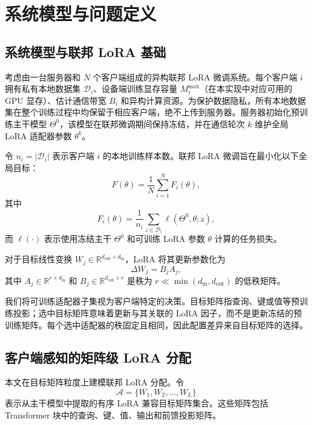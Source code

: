 \documentclass[10pt,conference,letterpaper]{IEEEtran}
\begin{document}
\section{系统模型与问题定义}\label{sec.model}

\subsection{系统模型与联邦 LoRA 基础}
考虑由一台服务器和 $N$ 个客户端组成的异构联邦 LoRA 微调系统。每个客户端 $i$ 拥有私有本地数据集 $\mathcal{D}_i$、设备端训练显存容量 $M_i^{\max}$（在本实现中对应可用的 GPU 显存）、估计通信带宽 $B_i$ 和异构计算资源。为保护数据隐私，所有本地数据集在整个训练过程中均保留于相应客户端，绝不上传到服务器。服务器初始化预训练主干模型 $\Theta^0$，该模型在联邦微调期间保持冻结，并在通信轮次 $k$ 维护全局 LoRA 适配器参数 $\theta^k$。

令 $n_i=|\mathcal{D}_i|$ 表示客户端 $i$ 的本地训练样本数。联邦 LoRA 微调旨在最小化以下全局目标：
\begin{equation}
F(\theta)=\frac{1}{N}\sum_{i=1}^{N}F_i(\theta),
\end{equation}
其中
\begin{equation}
F_i(\theta)=
\frac{1}{n_i}
\sum_{z\in\mathcal{D}_i}
\ell(\Theta^0,\theta;z),
\label{eq:fl-objective}
\end{equation}
而 $\ell(\cdot)$ 表示使用冻结主干 $\Theta^0$ 和可训练 LoRA 参数 $\theta$ 计算的任务损失。

对于目标线性变换 $W_j\in\mathbb{R}^{d_{\mathrm{out}}\times d_{\mathrm{in}}}$，LoRA 将其更新参数化为
\begin{equation}
\Delta W_j=B_jA_j,
\end{equation}
其中 $A_j\in\mathbb{R}^{r\times d_{\mathrm{in}}}$ 和 $B_j\in\mathbb{R}^{d_{\mathrm{out}}\times r}$ 是秩为 $r\ll \min(d_{\mathrm{in}},d_{\mathrm{out}})$ 的低秩矩阵。

我们将可训练适配器子集视为客户端特定的决策。目标矩阵指查询、键或值等预训练投影；选中目标矩阵意味着更新与其关联的 LoRA 因子，而不是更新冻结的预训练矩阵。每个选中适配器的秩固定且相同，因此配置差异来自目标矩阵的选择。

\subsection{客户端感知的矩阵级 LoRA 分配}
本文在目标矩阵粒度上建模联邦 LoRA 分配。令
\begin{equation}
\mathcal{A}=\{W_1,W_2,\ldots,W_L\}
\end{equation}
表示从主干模型中提取的有序 LoRA 兼容目标矩阵集合。这些矩阵包括 Transformer 块中的查询、键、值、输出和前馈投影矩阵。
\end{document}
